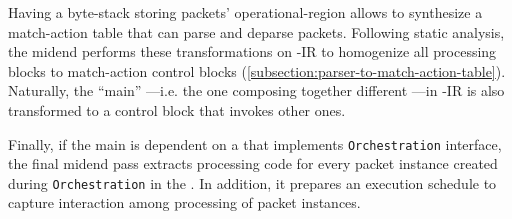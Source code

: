 \documentclass[letterpaper,twocolumn,10pt]{article}
\begin{document}
Having a byte-stack storing packets' operational-region allows to
synthesize a match-action table that can parse and deparse packets.
Following static analysis, the midend performs these transformations
on \ucomp-IR to homogenize all processing blocks to match-action
control blocks (\cref{subsection:parser-to-match-action-table}).
Naturally, the ``main'' \uprogram---i.e. the one composing together
different \uprograms---in \ucomp-IR is also transformed to a control
block that invokes other ones.

Finally, if the main \uprogram is dependent on a \uprogram that
implements \texttt{Orchestration} interface, the final midend pass
extracts processing code for every packet instance created during
\texttt{Orchestration} in the \uprogram. In addition, it prepares an
execution schedule to capture interaction among processing of packet
instances.




\end{document}

